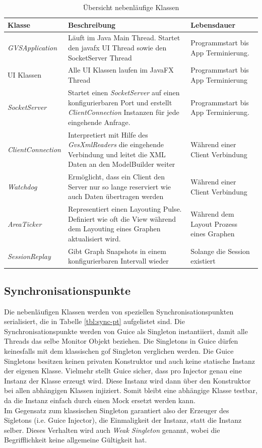 \documentclass[11pt,a4paper,english,oneside]{book}
\numberwithin{equation}{chapter}
\begin{document}
	\begin{table}[h!]
		\centering
		\begin{tabularx}{\linewidth}{l X X}
			\toprule 
			Klasse & Beschreibung & Lebensdauer \\
			\midrule
			\textit{GVSApplication} & Läuft im Java Main Thread. Startet den \gls{javafx} UI Thread sowie den SocketServer Thread & Programmstart bis App Terminierung. \\
			UI Klassen & Alle UI Klassen laufen im JavaFX Thread & Programmstart bis App Terminierung \\
			\textit{SocketServer} & Startet einen \textit{SocketServer} auf einen konfigurierbaren Port und erstellt \textit{ClientConnection} Instanzen für jede eingehende Anfrage. & Programmstart bis App Terminierung. \\
			\textit{ClientConnection} & Interpretiert mit Hilfe des \textit{GvsXmlReaders} die eingehende Verbindung und leitet die XML Daten an den ModelBuilder weiter & Während einer Client Verbindung \\
			\textit{Watchdog} & Ermöglicht, dass ein Client den Server nur so lange reserviert wie auch Daten übertragen werden & Während einer Client Verbindung \\
			\textit{AreaTicker} & Representiert einen Layouting Pulse. Definiert wie oft die View während dem Layouting eines Graphen aktualisiert wird. & Während dem Layout Prozess eines Graphen \\
			\textit{SessionReplay} & Gibt Graph Snapshots in einem konfigurierbaren Intervall wieder & Solange die Session existiert \\
			\bottomrule 
		\end{tabularx} 
		\caption{Übersicht nebenläufige Klassen} 
		\label{tbl:concurrent-classes}
	\end{table}
	
	\subsection{Synchronisationspunkte}
	
	Die nebenläufigen Klassen werden von speziellen Synchronisationspunkten serialisiert, die in Tabelle \ref{tbl:sync-pt} aufgelistet sind. Die Synchronisationspunkte werden von Guice \cite{guice} als Singleton instantiiert, damit alle Threads das selbe Monitor Objekt beziehen. Die Singletons in Guice dürfen keinesfalls mit dem klassischen \gls{gof} Singleton verglichen werden. Die Guice Singletons besitzen keinen privaten Konstruktor und auch keine statische Instanz der eigenen Klasse. Vielmehr stellt Guice sicher, dass pro Injector genau eine Instanz der Klasse erzeugt wird. Diese Instanz wird dann über den Konstruktor bei allen abhängigen Klassen injiziert. Somit bleibt eine abhängige Klasse testbar, da die Instanz einfach durch einen Mock ersetzt werden kann. \\
	\noindent
	Im Gegensatz zum klassischen Singleton garantiert also der Erzeuger des Sigletons (i.e. Guice Injector), die Einmaligkeit der Instanz, statt die Instanz selber. Dieses Verhalten wird auch \textit{Weak Singleton} genannt, wobei die Begrifflichkeit keine allgemeine Gültigkeit hat.
	
\end{document}
